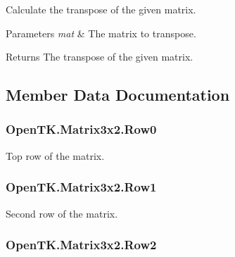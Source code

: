 Calculate the transpose of the given matrix. 


\begin{DoxyParams}{Parameters}
{\em mat} & The matrix to transpose.\\
\hline
\end{DoxyParams}
\begin{DoxyReturn}{Returns}
The transpose of the given matrix.
\end{DoxyReturn}


\subsection{Member Data Documentation}
\hypertarget{struct_open_t_k_1_1_matrix3x2_a3883e734401ea264fa2770963235fc52}{
\subsubsection[{Row0}]{ Open\-T\-K.\-Matrix3x2.\-Row0}}\label{struct_open_t_k_1_1_matrix3x2_a3883e734401ea264fa2770963235fc52}


Top row of the matrix. 

\hypertarget{struct_open_t_k_1_1_matrix3x2_a19ab32dcace66a7bac73ad53fdc94b2a}{
\subsubsection[{Row1}]{ Open\-T\-K.\-Matrix3x2.\-Row1}}\label{struct_open_t_k_1_1_matrix3x2_a19ab32dcace66a7bac73ad53fdc94b2a}


Second row of the matrix. 

\hypertarget{struct_open_t_k_1_1_matrix3x2_a08ee98f785c2540cdea103c513c4afe4}{
\subsubsection[{Row2}]{ Open\-T\-K.\-Matrix3x2.\-Row2}}\label{struct_open_t_k_1_1_matrix3x2_a08ee98f785c2540cdea103c513c4afe4}


